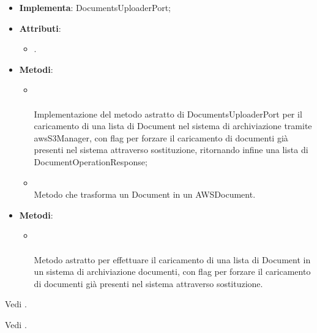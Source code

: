 \documentclass[10pt, a4paper]{article}
\begin{document}
\label{DocumentUploaderAWSS3Dettaglio}
\begin{itemize}
    \item \textbf{Implementa}: DocumentsUploaderPort;
    \item \textbf{Attributi}:
    \begin{itemize}
        \item {}.
    \end{itemize}
    \item \textbf{Metodi}:
    \begin{itemize}
        \item {}\\ \\
        Implementazione del metodo astratto di DocumentsUploaderPort per il caricamento di una lista di Document nel sistema di archiviazione tramite awsS3Manager, con flag per  forzare il caricamento di documenti già presenti nel sistema attraverso sostituzione, ritornando infine una lista di DocumentOperationResponse;
        \item {}\\
        Metodo che trasforma un Document in un AWSDocument.
    \end{itemize}
\end{itemize}

\label{DocumentsUploaderPortDettaglio}
\begin{itemize}
    \item \textbf{Metodi}:
    \begin{itemize}
        \item {}\\ \\
        Metodo astratto per effettuare il caricamento di una lista di Document in un sistema di archiviazione documenti, con flag per forzare il caricamento di documenti già presenti nel sistema attraverso sostituzione.
    \end{itemize}
\end{itemize}


Vedi .

Vedi .
\end{document}
